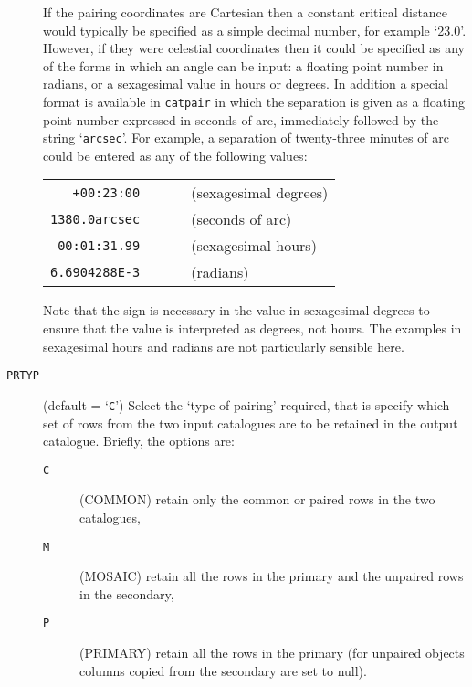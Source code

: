 \documentclass[twoside,11pt]{article}
\renewcommand{\_}{\texttt{\symbol{95}}}
\begin{document}
\begin{description}
   If the pairing coordinates are Cartesian then a constant critical distance
   would typically be specified as a simple decimal number, for example
   `23.0'. However, if they were celestial coordinates then it could be
   specified as any of the forms in which an angle can be input: a floating
   point number in radians, or a sexagesimal value in hours or degrees. In
   addition a special format is available in {\tt catpair} in which the
   separation is given as a floating point number expressed in seconds of
   arc, immediately followed by the string `{\tt arcsec}'. For example, a
   separation of twenty-three minutes of arc could be entered as any of
   the following values:

  \begin{center}
  \begin{tabular}{rll}
   {\tt +00:23:00}    & ~~~ & (sexagesimal degrees) \\
   {\tt 1380.0arcsec} & ~~~ & (seconds of arc)      \\
   {\tt 00:01:31.99}  & ~~~ & (sexagesimal hours)   \\
   {\tt 6.6904288E-3} & ~~~ & (radians)             \\
  \end{tabular}
  \end{center}

   Note that the sign is necessary in the value in sexagesimal degrees to
   ensure that the value is interpreted as degrees, not hours. The examples
   in sexagesimal hours and radians are not particularly sensible here.

  \item[ {\tt PRTYP} ] (default = `{\tt C}') Select the `type of
   pairing' required, that is specify which set of rows from the two input
   catalogues are to be retained in the output catalogue. Briefly, the
   options are:

  \begin{description}

    \item[{\tt C} ] (COMMON) retain only the common or paired rows in the
     two catalogues,

    \item[{\tt M} ] (MOSAIC) retain all the rows in the primary and the
     unpaired rows in the secondary,

    \item[{\tt P} ] (PRIMARY) retain all the rows in the primary (for
     unpaired objects columns copied from the secondary are set to null).


\end{description}
\end{description}
\end{document}

